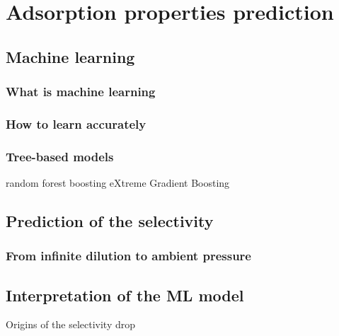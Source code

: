 \documentclass[main]{subfiles}
\begin{document}
\chapter{Adsorption properties prediction}
\vspace*{-1\baselineskip}

\section{Machine learning}

\subsection{What is machine learning}

\subsection{How to learn accurately}


\subsection{Tree-based models}
random forest 
boosting
eXtreme Gradient Boosting

\section{Prediction of the selectivity}

\subsection{From infinite dilution to ambient pressure}

\section{Interpretation of the ML model}

Origins of the selectivity drop

\OnlyInSubfile{\printglobalbibliography}
\end{document}
